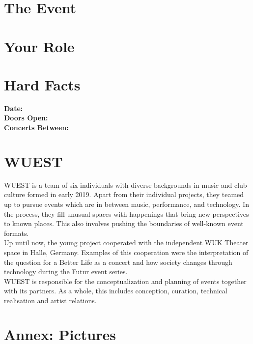 \documentclass[a4paper, 11pt]{article}
\begin{document}
\section*{The Event}

\section*{Your Role}

\section*{Hard Facts}

\begin{multicols}{2}

\textbf{Date:} \\
\textbf{Doors Open:} \\
\textbf{Concerts Between:} \\
    
\end{multicols}

\section*{WUEST}
WUEST is a team of six individuals with diverse backgrounds in music and club 
culture formed in early 2019. Apart from their individual projects, they 
teamed up to pursue events which are in between music, performance, and 
technology. In the process, they fill unusual spaces with happenings that 
bring new perspectives to known places. This also involves pushing the boundaries 
of well-known event formats. \\
Up until now, the young project cooperated with the independent WUK Theater space 
in Halle, Germany. Examples of this cooperation were the interpretation of the
question for a Better Life as a concert and how society changes through 
technology during the Futur event series. \\
WUEST is responsible for the conceptualization and planning of events together 
with its partners. As a whole, this includes conception, curation, technical 
realisation and artist relations.


\section*{Annex: Pictures}
\end{document}
